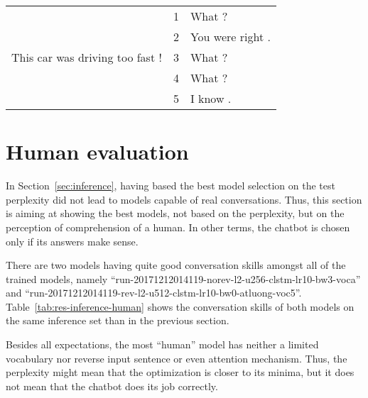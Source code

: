 \begin{longtable}{r|cl}
    \hline
    \multirow{5}{*}{This car was driving too fast !} & 1 &  What ?\\
    & 2 & You were right .\\
    & 3 & What ?\\
    & 4 & What ? \\
    & 5 & I know .\\

\end{longtable}


\section{Human evaluation}
In Section~\ref{sec:inference}, having based the best model selection on the test perplexity did not lead to models capable of real conversations. Thus, this section is aiming at showing the best models, not based on the perplexity, but on the perception of comprehension of a human. In other terms, the chatbot is chosen only if its answers make sense.

There are two models having quite good conversation skills amongst all of the trained models, namely ``run-20171212014119-norev-l2-u256-clstm-lr10-bw3-voca'' and ``run-20171212014119-rev-l2-u512-clstm-lr10-bw0-atluong-voc5''. Table~\ref{tab:res-inference-human} shows the conversation skills of both models on the same inference set than in the previous section.

Besides all expectations, the most ``human'' model has neither a limited vocabulary nor reverse input sentence or even attention mechanism. Thus, the perplexity might mean that the optimization is closer to its minima, but it does not mean that the chatbot does its job correctly.


